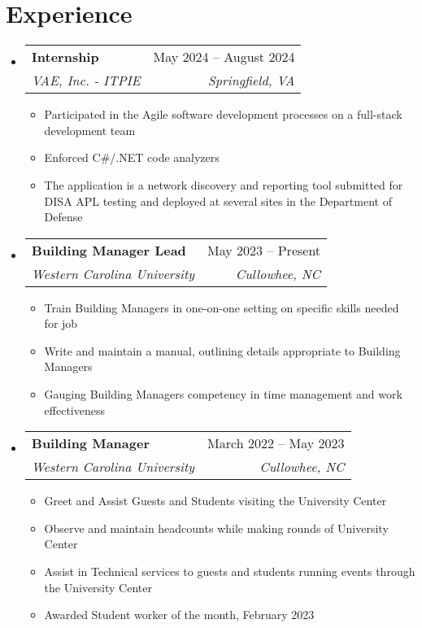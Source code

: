 \documentclass[letterpaper,11pt]{article}
\makeatletter
\newcommand{\resumeItem}[1]{
  \item\small{
    {#1 \vspace{-2pt}}
  }
}
\newcommand{\resumeSubheading}[4]{
  \vspace{-2pt}\item
    \begin{tabular*}{0.97\textwidth}[t]{l@{\extracolsep{\fill}}r}
      \textbf{#1} & #2 \\
      \textit{\small#3} & \textit{\small #4} \\
    \end{tabular*}\vspace{-7pt}
}
\newcommand{\resumeSubSubheading}[2]{
    \item
    \begin{tabular*}{0.97\textwidth}{l@{\extracolsep{\fill}}r}
      \textit{\small#1} & \textit{\small #2} \\
    \end{tabular*}\vspace{-7pt}
}
\newcommand{\resumeSubHeadingListStart}{\begin{itemize}[leftmargin=0.15in, label={}]}
\newcommand{\resumeSubHeadingListEnd}{\end{itemize}}
\newcommand{\resumeItemListStart}{\begin{itemize}}
\newcommand{\resumeItemListEnd}{\end{itemize}\vspace{-5pt}}
\makeatother
\begin{document}
\section{Experience}
  \resumeSubHeadingListStart

    \resumeSubheading
      {Internship}{May 2024 -- August 2024}
      {VAE, Inc. - ITPIE}{Springfield, VA}
      \resumeItemListStart
        \resumeItem{Participated in the Agile software development processes on a full-stack development team}
        \resumeItem{Enforced C\#/.NET code analyzers}
        \resumeItem{The application is a network discovery and reporting tool submitted for DISA APL testing and deployed at several sites in the Department of Defense}
      \resumeItemListEnd
      

    \resumeSubheading
      {Building Manager Lead}{May 2023 – Present}
      {Western Carolina University}{Cullowhee, NC}
      \resumeItemListStart
        \resumeItem{Train Building Managers in one-on-one setting on specific skills needed for job}
        \resumeItem{Write and maintain a manual, outlining details appropriate to Building Managers}
        \resumeItem{Gauging Building Managers competency in time management and work effectiveness}
    \resumeItemListEnd

    \resumeSubheading
      {Building Manager}{March 2022 – May 2023}
      {Western Carolina University}{Cullowhee, NC}
      \resumeItemListStart
        \resumeItem{Greet and Assist Guests and Students visiting the University Center}
        \resumeItem{Observe and maintain headcounts while making rounds of University Center}
        \resumeItem{Assist in Technical services to guests and students running events through the University Center}
        \resumeItem{Awarded Student worker of the month, February 2023}
      \resumeItemListEnd

  \resumeSubHeadingListEnd


\end{document}
